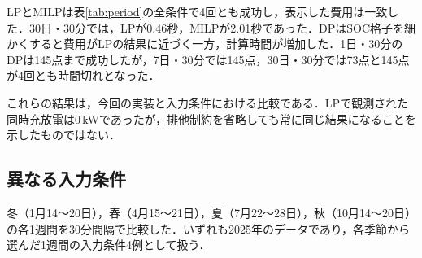 \documentclass[a4paper,11pt,xelatex,ja=standard]{bxjsarticle}
\begin{document}
LPとMILPは表\ref{tab:period}の全条件で4回とも成功し，表示した費用は一致した．30日・30分では，LPが0.46秒，MILPが2.01秒であった．DPはSOC格子を細かくすると費用がLPの結果に近づく一方，計算時間が増加した．1日・30分のDPは145点まで成功したが，7日・30分では145点，30日・30分では73点と145点が4回とも時間切れとなった．

これらの結果は，今回の実装と入力条件における比較である．LPで観測された同時充放電は0\,kWであったが，排他制約を省略しても常に同じ結果になることを示したものではない．

\clearpage
\subsection{異なる入力条件}
冬（1月14～20日），春（4月15～21日），夏（7月22～28日），秋（10月14～20日）の各1週間を30分間隔で比較した．いずれも2025年のデータであり，各季節から選んだ1週間の入力条件4例として扱う．
\end{document}

